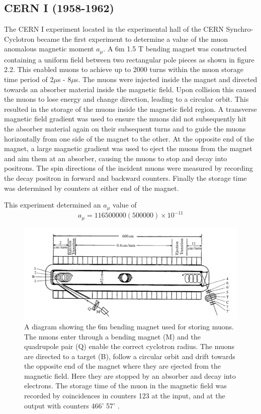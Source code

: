\subsection{CERN I (1958-1962)}
The CERN I experiment located in the experimental hall of the CERN Synchro-Cyclotron became the first experiment to determine a value of the muon anomalous magnetic moment $a_{\mu}$. A 6m 1.5 T bending magnet was constructed containing a uniform field between two rectangular pole pieces as shown in figure 2.2. This enabled muons to achieve up to 2000 turns within the muon storage time period of 2$\mu$s - 8$\mu$s. The muons were injected inside the magnet and directed towards an absorber material inside the magnetic field. Upon collision this caused the muons to lose energy and change direction, leading to a circular orbit. This resulted in the storage of the muons inside the magnetic field region. A transverse magnetic field gradient was used to ensure the muons did not subsequently hit the absorber material again on their subsequent turns and to guide the muons horizontally from one side of the magnet to the other.
At the opposite end of the magnet, a large magnetic gradient was used to eject the muons from the magnet and aim them at an absorber, causing the muons to stop and decay into positrons. The spin directions of the incident muons were measured by recording the decay positron in forward and backward counters. Finally the storage time was determined by counters at either end of the magnet\cite{Reference10}. 

This experiment determined an $a_{\mu}$ value of \cite{Reference11} \cite{Reference12}
\begin{equation}
a_{\mu} = 116500000(500000){\times}10^{-11}
\end{equation}

\begin{figure}[th]
\centering
\includegraphics[scale=0.7]{Figures/cern1}
\decoRule
\caption{ A diagram showing the 6m bending magnet used for storing muons. The muons enter through a bending magnet (M) and the quadrupole pair (Q) enable the correct cyclotron radius. The muons are directed to a target (B), follow a circular orbit and drift towards the opposite end of the magnet where they are ejected from the magnetic field. Here they are stopped by an absorber and decay into electrons. The storage time of the muon in the magnetic field was recorded by coincidences in counters 123 at the input, and at the output with counters 466' 57' \cite{Reference10}.}
\label{fig:cern1}
\end{figure}

